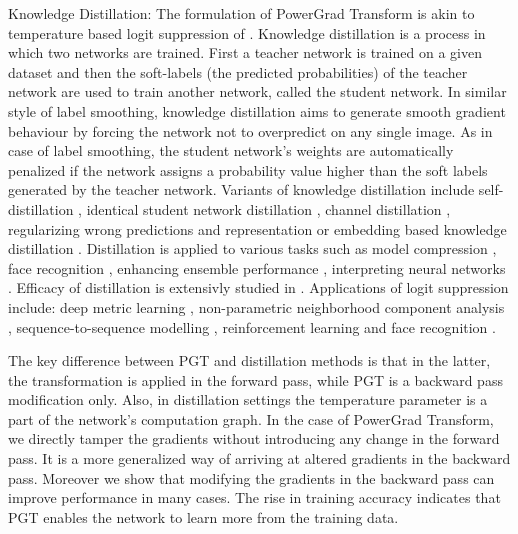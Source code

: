 \documentclass[times,sort&compress]{elsarticle}
\begin{document}
Knowledge Distillation: The formulation of PowerGrad Transform is akin to temperature
based logit suppression of \cite{hinton2015distilling}. Knowledge distillation
\cite{DBLP:conf/nips/BaC14} is a process in which two networks are trained. First a
teacher network is trained on a given dataset and then the soft-labels (the predicted
probabilities) of the teacher network are used to train another network, called the
student network. In similar style of label smoothing, knowledge distillation aims to
generate smooth gradient behaviour by forcing the network not to overpredict on any
single image. As in case of label smoothing, the student network's weights are
automatically penalized if the network assigns a probability value higher than the soft
labels generated by the teacher network. Variants of knowledge distillation include
self-distillation \cite{zhang2019your, wang2021memory}, identical student network
distillation \cite{furlanello2018born}, channel distillation \cite{ge2019distilling},
regularizing wrong predictions \cite{yun2020regularizing} and representation or
embedding based knowledge distillation \cite{aguilar2020knowledge, yao2018deep,
passalis2018unsupervised}. Distillation is applied to various tasks such as model
compression \cite{wang2020real}, face recognition \cite{ge2018low}, enhancing ensemble
performance \cite{zhang2018deep}, interpreting neural networks \cite{liu2018improving}.
Efficacy of distillation is extensivly studied in \cite{cho2019efficacy,
yuan2020revisiting}. Applications of logit suppression include: deep metric learning
\cite{zhai2018classification}, non-parametric neighborhood component analysis
\cite{wu2018improving}, sequence-to-sequence modelling \cite{chorowski2016towards},
reinforcement learning \cite{he2018determining} and face recognition
\cite{liu2017sphereface, wang2018cosface}.

The key difference between PGT and distillation methods is that in the latter, the
transformation is applied in the forward pass, while PGT is a backward pass modification
only. Also, in distillation settings the temperature parameter is a part of the
network's computation graph. In the case of PowerGrad Transform, we directly tamper the
gradients without introducing any change in the forward pass. It is a more generalized
way of arriving at altered gradients in the backward pass. Moreover we show that
modifying the gradients in the backward pass can improve performance in many cases. The
rise in training accuracy indicates that PGT enables the network to learn more from the
training data.
\end{document}
